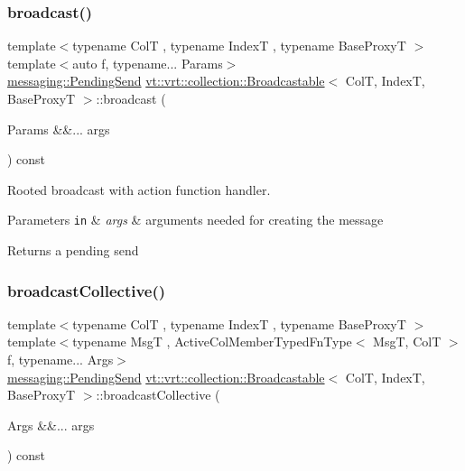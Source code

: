 \subsubsection{\texorpdfstring{broadcast()}{broadcast()}\hspace{0.1cm}{\footnotesize\ttfamily [7/7]}}
{\footnotesize\ttfamily template$<$typename ColT , typename IndexT , typename Base\+ProxyT $>$ \\
template$<$auto f, typename... Params$>$ \\
\hyperlink{structvt_1_1messaging_1_1_pending_send}{messaging\+::\+Pending\+Send} \hyperlink{structvt_1_1vrt_1_1collection_1_1_broadcastable}{vt\+::vrt\+::collection\+::\+Broadcastable}$<$ ColT, IndexT, Base\+ProxyT $>$\+::broadcast (\begin{DoxyParamCaption}\item[{Params \&\&...}]{args }\end{DoxyParamCaption}) const}



Rooted broadcast with action function handler. 


\begin{DoxyParams}[1]{Parameters}
\mbox{\tt in}  & {\em args} & arguments needed for creating the message\\
\hline
\end{DoxyParams}
\begin{DoxyReturn}{Returns}
a pending send 
\end{DoxyReturn}
\mbox{\label{structvt_1_1vrt_1_1collection_1_1_broadcastable_acef03dd57082f32556bef0e536a07fe9}} 
\subsubsection{\texorpdfstring{broadcast\+Collective()}{broadcastCollective()}\hspace{0.1cm}{\footnotesize\ttfamily [1/3]}}
{\footnotesize\ttfamily template$<$typename ColT , typename IndexT , typename Base\+ProxyT $>$ \\
template$<$typename MsgT , Active\+Col\+Member\+Typed\+Fn\+Type$<$ Msg\+T, Col\+T $>$ f, typename... Args$>$ \\
\hyperlink{structvt_1_1messaging_1_1_pending_send}{messaging\+::\+Pending\+Send} \hyperlink{structvt_1_1vrt_1_1collection_1_1_broadcastable}{vt\+::vrt\+::collection\+::\+Broadcastable}$<$ ColT, IndexT, Base\+ProxyT $>$\+::broadcast\+Collective (\begin{DoxyParamCaption}\item[{Args \&\&...}]{args }\end{DoxyParamCaption}) const}



